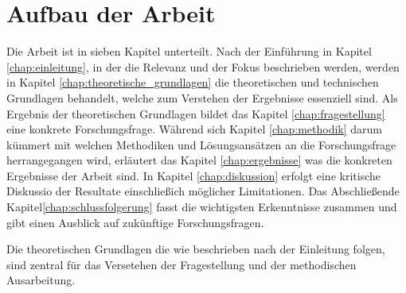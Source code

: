 \section{Aufbau der Arbeit}
\label{sec:aufbau_der_arbeit} Die Arbeit ist in sieben Kapitel unterteilt. Nach der
Einführung in Kapitel \ref{chap:einleitung}, in der die Relevanz und der Fokus
beschrieben werden, werden in Kapitel \ref{chap:theoretische_grundlagen} die theoretischen
und technischen Grundlagen behandelt, welche zum Verstehen der Ergebnisse
essenziell sind. Als Ergebnis der theoretischen Grundlagen bildet das Kapitel \ref{chap:fragestellung}
eine konkrete Forschungsfrage. Während sich Kapitel \ref{chap:methodik} darum
kümmert mit welchen Methodiken und Lösungsansätzen an die Forschungsfrage
herrangegangen wird, erläutert das Kapitel \ref{chap:ergebnisse} was die konkreten
Ergebnisse der Arbeit sind. In Kapitel \ref{chap:diskussion} erfolgt eine
kritische Diskussio der Resultate einschließich möglicher Limitationen. Das Abschließende
Kapitel\ref{chap:schlussfolgerung} fasst die wichtigsten Erkenntnisse zusammen
und gibt einen Ausblick auf zukünftige Forschungsfragen.

Die theoretischen Grundlagen die wie beschrieben nach der Einleitung folgen, sind
zentral für das Versetehen der Fragestellung und der methodischen Ausarbeitung.

